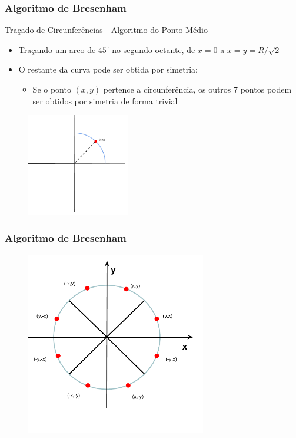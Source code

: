 \documentclass{beamer}
\begin{document}
\begin{frame}
\frametitle{Algoritmo de Bresenham}
		\begin{block}{Traçado de Circunferências - Algoritmo do Ponto Médio}
		\begin{itemize}
			\item Traçando um arco de $45^\circ$ no segundo octante, de $x=0$ a $x = y = R/\sqrt{2}$
			\item O restante da curva pode ser obtida por simetria:
				\begin{itemize}
					\item Se o ponto $(x,y)$ pertence a circunferência, os outros 7 pontos podem ser obtidos por simetria de forma trivial
				\end{itemize}
		\end{itemize}
	\end{block}
	\begin{figure}[!h]
			\begin{center}
			\includegraphics[width=0.4\textwidth]{Figures/Pon1-4Cir}
			\end{center}
		\end{figure}
\end{frame}

\begin{frame}
\frametitle{Algoritmo de Bresenham}
	\begin{figure}[!h]
			\begin{center}
			\includegraphics[width=0.7\textwidth]{Figures/SimCir}
			\end{center}
		\end{figure}
\end{frame}
\end{document}
